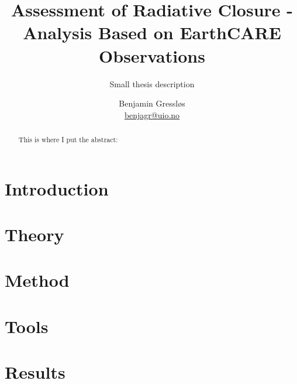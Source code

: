 \documentclass[]{Front_Page_UiO/uiomasterthesis}
\title{Assessment of Radiative Closure - Analysis Based on EarthCARE Observations}
\subtitle{Small thesis description}
\author{Benjamin Gressløs\\ \url{benjagr@uio.no}}
\begin{document}
\uiomasterfp[kind={Master's thesis}, supervisor={Tove Svendby},  compact, colour=pink, date=\today, dept={Department of Physics}, 
long]


\newcommand{\note}[1]{\textcolor{green}{#1}}
\newcommand{\tove}[2]{\textcolor{red}{#1}}

\renewcommand{\floatpagefraction}{0.9}

\tableofcontents

\begin{abstract}
    This is where I put the abstract: 

\end{abstract}

\section{Introduction} 
\label{Introduction}


\section{Theory}
\label{Theory}


\section{Method}
\label{Method}


\section{Tools}
\label{Tools}


\section{Results}
\label{Results}

\end{document}
